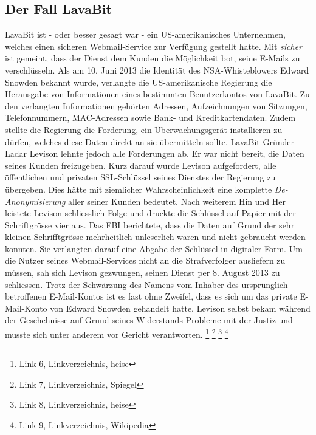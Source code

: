 \subsection{Der Fall LavaBit}
LavaBit ist - oder besser gesagt war - ein US-amerikanisches Unternehmen, welches einen sicheren Webmail-Service zur Verfügung gestellt hatte. Mit \textit{sicher} ist gemeint, dass der Dienst dem Kunden die Möglichkeit bot, seine E-Mails zu verschlüsseln. Als am 10. Juni 2013 die Identität des NSA-Whisteblowers Edward Snowden bekannt wurde, verlangte die US-amerikanische Regierung die Herausgabe von Informationen eines bestimmten Benutzerkontos von LavaBit. Zu den verlangten Informationen gehörten Adressen, Aufzeichnungen von Sitzungen, Telefonnummern, MAC-Adressen sowie Bank- und Kreditkartendaten. Zudem stellte die Regierung die Forderung, ein Überwachungsgerät installieren zu dürfen, welches diese Daten direkt an sie übermitteln sollte. LavaBit-Gründer Ladar Levison lehnte jedoch alle Forderungen ab. Er war nicht bereit, die Daten seines Kunden freizugeben. Kurz darauf wurde Levison aufgefordert, alle öffentlichen und privaten SSL-Schlüssel seines Dienstes der Regierung zu übergeben. Dies hätte mit ziemlicher Wahrscheinlichkeit eine komplette \textit{De-Anonymisierung} aller seiner Kunden bedeutet. Nach weiterem Hin und Her leistete Levison schliesslich Folge und druckte die Schlüssel auf Papier mit der Schriftgrösse vier aus. Das FBI berichtete, dass die Daten auf Grund der sehr kleinen Schrifftgrösse mehrheitlich unleserlich waren und nicht gebraucht werden konnten. Sie verlangten darauf eine Abgabe der Schlüssel in digitaler Form. Um die Nutzer seines Webmail-Services nicht an die Strafverfolger ausliefern zu müssen, sah sich Levison gezwungen, seinen Dienst per 8. August 2013 zu schliessen. Trotz der Schwärzung des Namens vom Inhaber des ursprünglich betroffenen E-Mail-Kontos ist es fast ohne Zweifel, dass es sich um das private E-Mail-Konto von Edward Snowden gehandelt hatte. Levison selbst bekam während der Geschehnisse auf Grund seines Widerstands Probleme mit der Justiz und musste sich unter anderem vor Gericht verantworten.
\footnote{Link 6, Linkverzeichnis, heise}
\footnote{Link 7, Linkverzeichnis, Spiegel}
\footnote{Link 8, Linkverzeichnis, heise}
\footnote{Link 9, Linkverzeichnis, Wikipedia}

